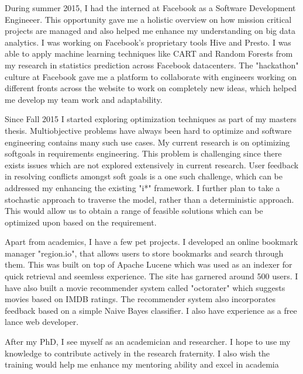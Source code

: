 \documentclass{article}
\begin{document}
\bigskip
During summer 2015, I had the interned at Facebook as a Software Development Engineeer. This opportunity gave me a holistic overview on how mission critical projects are managed and also helped me enhance my understanding on big data analytics. I was working on Facebook's proprietary tools Hive and Presto. I was able to apply machine learning techniques like CART and Random Forests from my research in statistics prediction across Facebook datacenters. The "hackathon" culture at Facebook gave me a platform to collaborate with engineers working on different fronts across the website to work on completely new ideas, which helped me develop my team work and adaptability. 

\bigskip
Since Fall 2015 I started exploring optimization techniques as part of my masters thesis. Multiobjective problems have always been hard to optimize and software engineering contains many such use cases. My current research is on optimizing softgoals in requirements engineering. This problem is challenging since there exists issues which are not explored extensively in current research. User feedback in resolving conflicts amongst soft goals is a one such challenge, which can be addressed my enhancing the existing "i*" framework. I further plan to take a stochastic approach to traverse the model, rather than a deterministic approach. This would allow us to obtain a range of feasible solutions which can be optimized upon based on the requirement.

\bigskip
Apart from academics, I have a few pet projects. I developed an online bookmark manager "region.io", that allows users to store bookmarks and search through them. This was built on top of Apache Lucene which was used as an indexer for quick retrieval and seemless experience. The site has garnered around 500 users. I have also built a movie recommender system called "octorater" which suggests movies based on IMDB ratings. The recommender system also incorporates feedback based on a simple Naive Bayes classifier. I also have experience as a free lance web developer.

\bigskip
After my PhD, I see myself as an academician and researcher. I hope to use my knowledge to contribute actively in the research fraternity. I also wish the training would help me enhance my mentoring ability and excel in academia
\end{document}
